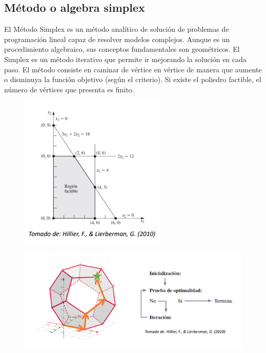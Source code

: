 \documentclass[conference]{IEEEtran}
\begin{document}
\subsection{Método o algebra simplex}

El Método Simplex es un método analítico de solución de problemas de
programación lineal capaz de resolver modelos complejos. Aunque es un
procedimiento algebraico, sus conceptos fundamentales son geométricos.
El Simplex es un método iterativo que permite ir mejorando la solución en
cada paso. El método consiste en caminar de vértice en vértice de manera que
aumente o disminuya la función objetivo (según el criterio). Si existe el
poliedro factible, el número de vértices que presenta es finito.

\begin{figure}[H]
    \begin{center}
        \includegraphics[width=.7\linewidth]{./Images/MetodoSimplex.png}
        \caption{}
    \end{center}
\end{figure}

\begin{figure}[H]
    \begin{center}
        \includegraphics[width=\linewidth]{./Images/MetodoSimplex2.png}
        \caption{}
    \end{center}
\end{figure}
\end{document}
